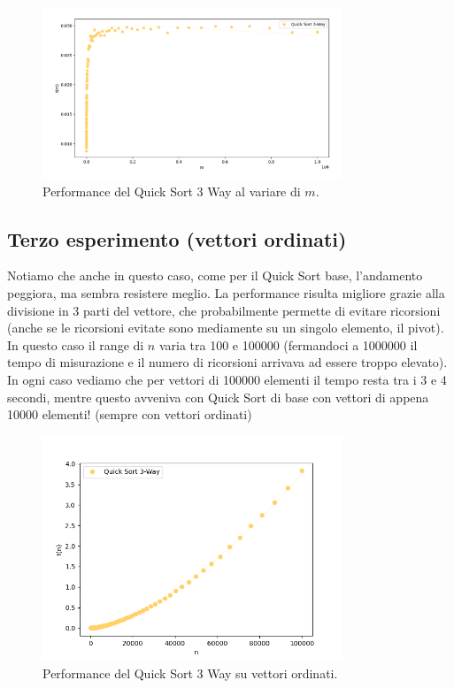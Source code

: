 \documentclass[a4paper, 12pt, oneside]{book}
\begin{document}
\begin{figure}[H]
    \centering
    \includegraphics[width=0.8\textwidth]{images/grafico_quick_sort_3_way_m.png}
    \caption{Performance del Quick Sort 3 Way al variare di \(m\).}
    \label{fig:quick_sort_3_way_m}
\end{figure}

\subsection{Terzo esperimento (vettori ordinati)}

Notiamo che anche in questo caso, come per il Quick Sort base, l'andamento peggiora, ma sembra resistere meglio.
La performance risulta migliore grazie alla divisione in 3 parti del vettore, che probabilmente permette di evitare ricorsioni (anche se le ricorsioni evitate sono mediamente su un singolo elemento, il pivot).
In questo caso il range di \(n\) varia tra 100 e 100000 (fermandoci a 1000000 il tempo di misurazione e il numero di ricorsioni arrivava ad essere troppo elevato). In ogni caso vediamo che per vettori di 100000 elementi il tempo resta tra i 3 e 4 secondi, mentre questo avveniva con Quick Sort di base con vettori di appena 10000 elementi! (sempre con vettori ordinati)

\begin{figure}[H]
    \centering
    \includegraphics[width=0.8\textwidth]{images/quicksort3wayCasoPeggiore.png}
    \caption{Performance del Quick Sort 3 Way su vettori ordinati.}
    \label{fig:quick_sort_3_way_m}
\end{figure}
\end{document}
